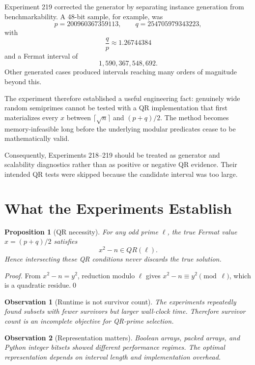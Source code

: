 \documentclass[11pt,a4paper]{article}
\newtheorem{proposition}{Proposition}
\newtheorem{observation}{Observation}
\begin{document}
Experiment 219 corrected the generator by separating instance generation from benchmarkability. A 48-bit sample, for example, was
\[
 p=200960367359113,
 \qquad
 q=254705979343223,
\]
with
\[
\frac{q}{p}\approx1.26744384
\]
and a Fermat interval of
\[
1{,}590{,}367{,}548{,}692.
\]
Other generated cases produced intervals reaching many orders of magnitude beyond this.

The experiment therefore established a useful engineering fact: genuinely wide random semiprimes cannot be tested with a QR implementation that first materializes every $x$ between $\lceil\sqrt n\rceil$ and $(p+q)/2$. The method becomes memory-infeasible long before the underlying modular predicates cease to be mathematically valid.

Consequently, Experiments 218--219 should be treated as generator and scalability diagnostics rather than as positive or negative QR evidence. Their intended QR tests were skipped because the candidate interval was too large.

\section{What the Experiments Establish}

\begin{proposition}[QR necessity]
For any odd prime $\ell$, the true Fermat value $x=(p+q)/2$ satisfies
\[
 x^2-n\in QR(\ell).
\]
Hence intersecting these QR conditions never discards the true solution.
\end{proposition}

\begin{proof}
From $x^2-n=y^2$, reduction modulo $\ell$ gives $x^2-n\equiv y^2\pmod\ell$, which is a quadratic residue.\qed
\end{proof}

\begin{observation}[Runtime is not survivor count]
The experiments repeatedly found subsets with fewer survivors but larger wall-clock time. Therefore survivor count is an incomplete objective for QR-prime selection.
\end{observation}

\begin{observation}[Representation matters]
Boolean arrays, packed arrays, and Python integer bitsets showed different performance regimes. The optimal representation depends on interval length and implementation overhead.
\end{observation}
\end{document}
